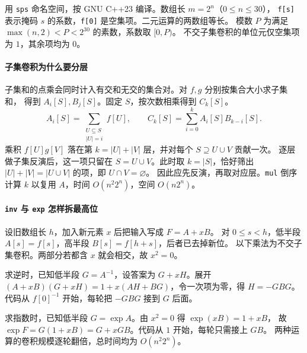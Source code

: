 用 \texttt{sps} 命名空间，按 GNU C++23 编译。数组长 \(m=2^n\)（\(0\le n\le30\)），
\texttt{f[s]} 表示掩码 \(s\) 的系数，\texttt{f[0]} 是空集项。二元运算的两数组等长。
模数 \(P\) 为满足 \(\max(n,2)<P<2^{30}\) 的素数，系数取 \([0,P)\)。
不交子集卷积的单位元仅空集项为 \(1\)，其余项均为 \(0\)。

\paragraph*{子集卷积为什么要分层}
子集和的点乘会同时计入有交和无交的集合对。对 \(f,g\) 分别按集合大小求子集和，
得到 \(A_i[S],B_j[S]\)。固定 \(S\)，按次数相乘得到 \(C_k[S]\)。
\[
    A_i[S]=\sum_{\substack{U\subseteq S\\|U|=i}} f[U],
    \qquad
    C_k[S]=\sum_{i=0}^{k} A_i[S]B_{k-i}[S].
\]
乘积 \(f[U]g[V]\) 落在第 \(k=|U|+|V|\) 层，并对每个 \(S\supseteq U\cup V\) 贡献一次。
逐层做子集反演后，这一项只留在 \(S=U\cup V\)。此时取 \(k=|S|\)，恰好筛出
\(|U|+|V|=|U\cup V|\) 的项，即 \(U\cap V=\varnothing\)。
因此应先反演，再取对应层。\texttt{mul} 倒序计算 \(k\) 以复用 \(A\)，时间 \(O(n^2 2^n)\)，空间 \(O(n2^n)\)。

\paragraph*{\texttt{inv} 与 \texttt{exp} 怎样拆最高位}
设旧数组长 \(h\)，加入新元素 \(x\) 后把输入写成 \(F=A+xB\)。
对 \(0\le s<h\)，低半段 \(A[s]=f[s]\)，高半段 \(B[s]=f[h+s]\)，后者已去掉新位。
以下乘法为不交子集卷积。两部分若都含 \(x\) 就会相交，故 \(x^2=0\)。

求逆时，已知低半段 \(G=A^{-1}\)，设答案为 \(G+xH\)。展开
\((A+xB)(G+xH)=1+x(AH+BG)\)，令一次项为零，得 \(H=-GBG\)。
代码从 \(f[0]^{-1}\) 开始，每轮把 \(-GBG\) 接到 \(G\) 后面。

求指数时，已知低半段 \(G=\exp A\)。由 \(x^2=0\) 得 \(\exp(xB)=1+xB\)，
故 \(\exp F=G(1+xB)=G+xGB\)。代码从 \(1\) 开始，每轮只需接上 \(GB\)。
两种运算的卷积规模逐轮翻倍，总时间均为 \(O(n^2 2^n)\)。

